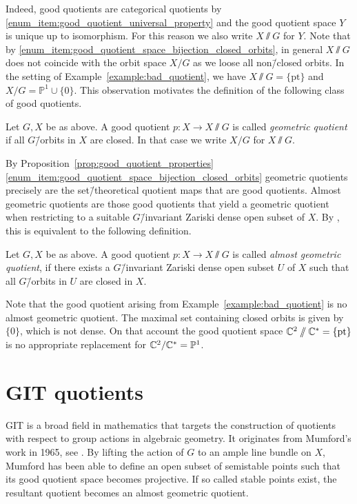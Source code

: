 Indeed, good quotients are categorical quotients by \ref{enum_item:good_quotient_universal_property} and the good quotient space $Y$ is unique up to isomorphism. For this reason we also write $X\sslash G$ for $Y$.
%
Note that by \ref{enum_item:good_quotient_space_bijection_closed_orbits}, in general $X\sslash G$ does not coincide with the orbit space $X / G$ as we loose all non\=/closed orbits. In the setting of Example~\ref{example:bad_quotient}, we have $X\sslash G = \{\text{pt}\}$ and $X/G = \mathbb{P}^1 \cup \{0\}$. This observation motivates the definition of the following class of good quotients.

\begin{defi}
	Let $G, X$ be as above. A good quotient $p\colon X \rightarrow X\sslash G$ is called \emph{geometric quotient} if all $G$\=/orbits in $X$ are closed. In that case we write $X/G$ for $X\sslash G$.
\end{defi}

By Proposition~\ref{prop:good_quotient_properties}\ref{enum_item:good_quotient_space_bijection_closed_orbits} geometric quotients precisely are the set\=/theoretical quotient maps that are good quotients. Almost geometric quotients are those good quotients that yield a geometric quotient when restricting to a suitable $G$\=/invariant Zariski dense open subset of $X$. By \cite[Proposition 5.0.11]{cls}, this is equivalent to the following definition.

\begin{defi}
	Let $G, X$ be as above. A good quotient $p\colon X \rightarrow X\sslash G$ is called \emph{almost geometric quotient}, if there exists a $G$\=/invariant Zariski dense open subset $U$ of $X$ such that all $G$\=/orbits in $U$ are closed in $X$.
\end{defi}

Note that the good quotient arising from Example~\ref{example:bad_quotient} is no almost geometric quotient. The maximal set containing closed orbits is given by $\{0\}$, which is not dense. On that account the good quotient space $\mathbb{C}^2 \sslash \mathbb{C}^* = \{\text{pt}\}$ is no appropriate replacement for $\mathbb{C}^2/\mathbb{C}^* = \mathbb{P}^1$.

\section{GIT quotients}
\ac{GIT} is a broad field in mathematics that targets the construction of quotients with respect to group actions in algebraic geometry. It originates from Mumford's work in 1965, see \cite{git}. By lifting the action of $G$ to an ample line bundle on $X$, Mumford has been able to define an open subset of semistable points such that its good quotient space becomes projective. If so called stable points exist, the resultant quotient becomes an almost geometric quotient.

